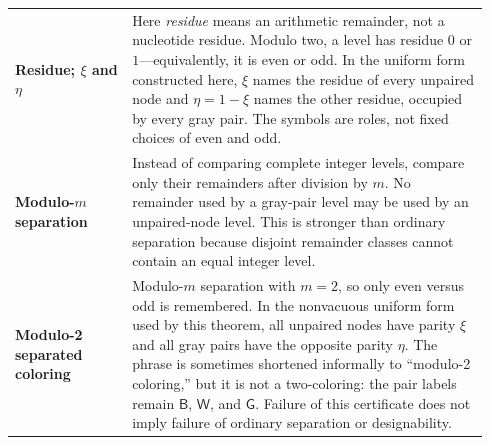 \documentclass[11pt]{article}
\newcommand{\Bcol}{\mathsf{B}}
\newcommand{\Wcol}{\mathsf{W}}
\newcommand{\Gray}{\mathsf{G}}
\begin{document}
{\begin{longtable}{@{}>{\raggedright\arraybackslash\bfseries}p{0.235\linewidth}>{\raggedright\arraybackslash}p{0.705\linewidth}@{}}
\addlinespace[3pt]
Residue; $\xi$ and $\eta$ & Here \emph{residue} means an arithmetic remainder, not a nucleotide residue.  Modulo two, a level has residue $0$ or $1$---equivalently, it is even or odd.  In the uniform form constructed here, $\xi$ names the residue of every unpaired node and $\eta=1-\xi$ names the other residue, occupied by every gray pair.  The symbols are roles, not fixed choices of even and odd. \\
\addlinespace[3pt]
Modulo-$m$ separation & Instead of comparing complete integer levels, compare only their remainders after division by $m$.  No remainder used by a gray-pair level may be used by an unpaired-node level.  This is stronger than ordinary separation because disjoint remainder classes cannot contain an equal integer level. \\
\addlinespace[3pt]
Modulo-2 separated coloring & Modulo-$m$ separation with $m=2$, so only even versus odd is remembered.  In the nonvacuous uniform form used by this theorem, all unpaired nodes have parity $\xi$ and all gray pairs have the opposite parity $\eta$.  The phrase is sometimes shortened informally to ``modulo-2 coloring,'' but it is not a two-coloring: the pair labels remain $\Bcol$, $\Wcol$, and $\Gray$.  Failure of this certificate does not imply failure of ordinary separation or designability. \\


\end{longtable}}
\end{document}
